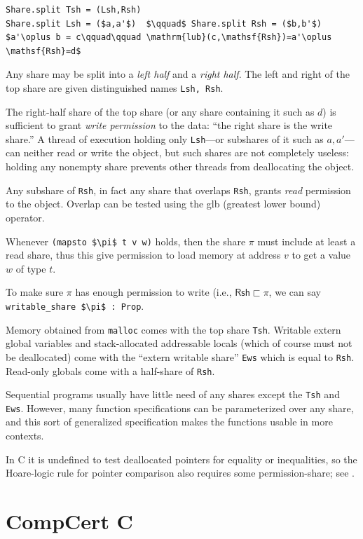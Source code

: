 \documentclass[12pt,fleqn,openany,oneside,showtrims]{memoir}
\newcommand{\ychapter}[2]{\chapter[#1]{#1 \hfill \normalsize #2}}
\begin{document}
\begin{lstlisting}
Share.split Tsh = (Lsh,Rsh)
Share.split Lsh = ($a,a'$)  $\qquad$ Share.split Rsh = ($b,b'$)
$a'\oplus b = c\qquad\qquad \mathrm{lub}(c,\mathsf{Rsh})=a'\oplus \mathsf{Rsh}=d$
\end{lstlisting}
Any share may be split into a \emph{left half} and a \emph{right half}.
The left and right of the top share are given distinguished names
\lstinline{Lsh, Rsh}.

The right-half share of the top share (or any share containing it such
as $d$) is sufficient to grant \emph{write permission} to the data:
``the right share is the write share.''  A thread of execution holding
only \lstinline{Lsh}---or subshares of it such as $a,a'$---can neither
read or write the object, but such shares are not completely useless:
holding any nonempty share prevents other threads from deallocating
the object.

Any subshare of \lstinline{Rsh}, in fact any share that overlaps
 \lstinline{Rsh}, grants \emph{read} permission to the object.
Overlap can be tested using the glb (greatest lower bound) operator.

Whenever \lstinline{(mapsto $\pi$ t v w)} holds, then the share $\pi$
must include at least a read share, thus this give permission to load
memory at address $v$ to get a value $w$ of type $t$.

To make sure $\pi$ has enough permission to write (i.e., 
$\mathsf{Rsh} \sqsubset \pi$, we can say \lstinline{writable_share $\pi$ : Prop}.

Memory obtained from \lstinline{malloc} comes with the top share
\lstinline{Tsh}.  Writable extern global variables
and stack-allocated addressable locals (which of course
must not be deallocated) come with the ``extern writable share'' 
\lstinline{Ews} which is equal to \lstinline{Rsh}.
Read-only globals come with a half-share of \lstinline{Rsh}.

Sequential programs usually have little need of any shares except
the \lstinline{Tsh} and \lstinline{Ews}.  However, many function 
specifications can be parameterized over any share, and this sort
of generalized specification makes the functions usable in more contexts.

In C it is undefined to test deallocated pointers for equality or inequalities,
so the Hoare-logic rule for pointer comparison also requires some
permission-share; see .


\ychapter{CompCert C}{}
\end{document}
